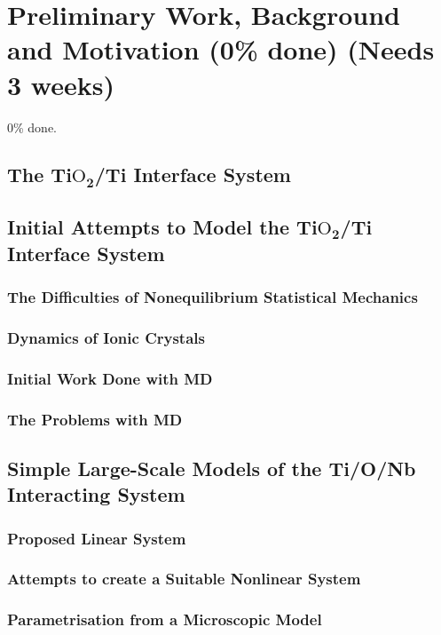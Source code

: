 \chapter{Preliminary Work, Background and Motivation (0\% done) (Needs 3 weeks)}

0\% done.

\section{The Ti$\text{O}_\mathbf{2}$/Ti Interface System}


\section{Initial Attempts to Model the Ti$\text{O}_\mathbf{2}$/Ti Interface System}
\subsection{The Difficulties of Nonequilibrium Statistical Mechanics}
\subsection{Dynamics of Ionic Crystals}
\subsection{Initial Work Done with MD}
\subsection{The Problems with MD}

\section{Simple Large-Scale Models of the Ti/O/Nb Interacting System}
\subsection{Proposed Linear System}
\subsection{Attempts to create a Suitable Nonlinear System}
\subsection{Parametrisation from a Microscopic Model}

